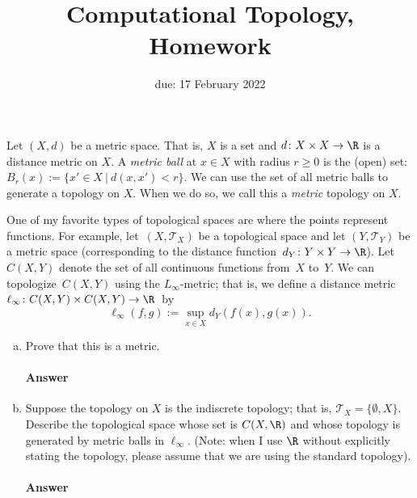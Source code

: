 \documentclass{article}
\title{Computational Topology, Homework \hwnum}
\author{\todo{your name here}}
\date{due: 17 February 2022}
\begin{document}
\maketitle



Let $(X,d)$ be a metric space.  That is, $X$ is a set and $d \colon X \times X
\to \R$ is a distance metric on $X$.  A \emph{metric ball} at $x \in X$ with
radius $r \geq 0$ is the (open) set: $B_r(x) := \{x' \in X ~|~ d(x,x') < r \}$.
We can use the set of all metric balls to generate a
topology on $X$.  When we do so, we call this a \emph{metric} topology on $X$.

One of my favorite types of topological spaces are where the points represent
functions.  For example, let~$(X,\mathcal{T}_X)$ be a topological space
and let $(Y,\mathcal{T}_Y)$ be
a metric space (corresponding to the distance function~$d_Y
\colon Y \times Y \to \R$).  Let $C(X,Y)$ denote the set of all continuous
functions from~$X$ to~$Y$.  We can topologize~$C(X,Y)$ using the $L_{\infty}$-metric; that is,
we define a distance metric $\ell_{\infty} \colon C(X,Y) \times C(X,Y) \to
\R$~by
$$\ell_{\infty}(f,g) := \sup_{x \in X} d_Y(f(x),g(x)).$$

\begin{enumerate}[(a)]
    \item Prove that this is a metric.

        \paragraph{Answer}

    \item Suppose the topology on $X$ is the indiscrete topology; that is,
        $\mathcal{T}_X=\{\emptyset,X\}$.  Describe the topological space whose
        set is $C(X,\R)$ and whose topology is generated by metric balls in
        $\ell_{\infty}$. (Note: when I use $\R$ without explicitly stating the
        topology, please assume that we are using the standard topology).

        \paragraph{Answer}

\end{enumerate}
\end{document}
